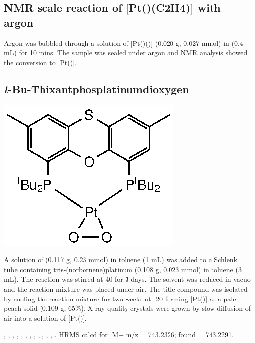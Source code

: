 \subsection*{NMR scale reaction of [Pt(\tButhixantphos)(C2H4)] with argon}
Argon was bubbled through a solution of [Pt(\tButhixantphos)()] (0.020 g, 0.027 mmol) in  (0.4 mL) for 10 mins.  The sample was sealed under argon and NMR analysis showed the  conversion to [Pt(\tButhixantphos)].  

\subsection*{\emph{t}-Bu-Thixantphosplatinumdioxygen}
\begin{structure}[h]
\begin{center}
\includegraphics{../Structures/StBuPtO2.eps}
\end{center}
\end{structure}

A solution of \tButhixantphos{} (0.117 g, 0.23 mmol) in toluene (1 mL) was added to a Schlenk tube containing tris-(norbornene)platinum (0.108 g, 0.023 mmol) in toluene (3 mL).  The reaction was stirred at 40 \degC{} for 3 days.  The solvent was reduced in vacuo and the reaction mixture was placed under air.  The title compound was isolated by cooling the reaction mixture for two weeks at -20 \degC{} forming [Pt(\tButhixantphos)] as a pale peach solid (0.109 g, 65\%).  X-ray quality crystals were grown by slow diffusion of air into a  solution of [Pt(\tButhixantphos)].

,
,
,
,
,
,
,
,
,
,
,
,
.
HRMS calcd for  [M+\ce{H]+} m/z = 743.2326; found = 743.2291.

